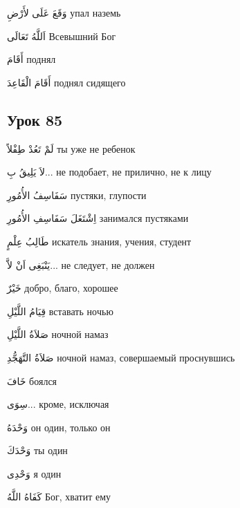 \documentclass[a5paper]{article}
\newcommand\textstyleDropCaps[1]{#1}
\newcommand\textstyleCaptioncharacters[1]{#1}
\begin{document}
\textstyleCaptioncharacters{وَقَعَ عَلَى لأَرْضِ }\textstyleDropCaps{упал наземь‎}

\textstyleCaptioncharacters{اَللَّهُ تَعَالَى }\textstyleDropCaps{Всевышний Бог‎}

\textstyleCaptioncharacters{أَقَامَ }\textstyleDropCaps{поднял‎}

\textstyleCaptioncharacters{أَقَامَ الْقَاعِدَ }\textstyleDropCaps{поднял сидя­щего‎}

\subsection[Урок 85‎]{\textstyleDropCaps{Урок 85‎}}
\textstyleCaptioncharacters{لَمْ تَعُدْ طِفْلاً }\textstyleDropCaps{ты уже не ребенок‎}

\textstyleCaptioncharacters{لاَ يَلِيقُ بِ... }\textstyleDropCaps{не подоба­ет, не прилично, не к лицу‎}

\textstyleCaptioncharacters{سَفَاسِفُ الأُمُورِ }\textstyleDropCaps{пустя­ки, глупости‎}

\textstyleCaptioncharacters{اِشْتَغَلَ سَفَاسِفِ الأُمُورِ }\textstyleDropCaps{занимался пустяками‎}

\textstyleCaptioncharacters{طَالِبُ عِلْمٍ }\textstyleDropCaps{искатель зна­ния, учения, студент‎}

\textstyleCaptioncharacters{يَنْبَغِى اَنْ لاَّ... }\textstyleDropCaps{не следуе­т, не должен‎}

\textstyleCaptioncharacters{خَيْرٌ }\textstyleDropCaps{добро, благо, хоро­шее‎}

\textstyleCaptioncharacters{قِيَامُ اللَّيْلِ }\textstyleDropCaps{вставать но­чью‎}

\textstyleCaptioncharacters{صَلاَةُ اللَّيْلِ }\textstyleDropCaps{ночной на­маз‎}

\textstyleCaptioncharacters{صَلاَةُ التَّهَجُّدِ }\textstyleDropCaps{ночной намаз, совершаемый проснувшись‎}

\textstyleCaptioncharacters{خَافَ }\textstyleDropCaps{боялся‎}

\textstyleCaptioncharacters{سِوَى... }\textstyleDropCaps{кроме, исключая‎}

\textstyleCaptioncharacters{وَحْدَهُ }\textstyleDropCaps{он один, только он‎}

\textstyleCaptioncharacters{وَحْدَكَ }\textstyleDropCaps{ты один‎}

\textstyleCaptioncharacters{وَحْدِى }\textstyleDropCaps{я один‎}

\textstyleCaptioncharacters{كَفَاهُ اللَّهُ }\textstyleDropCaps{Бог, хватит ему‎}
\end{document}
